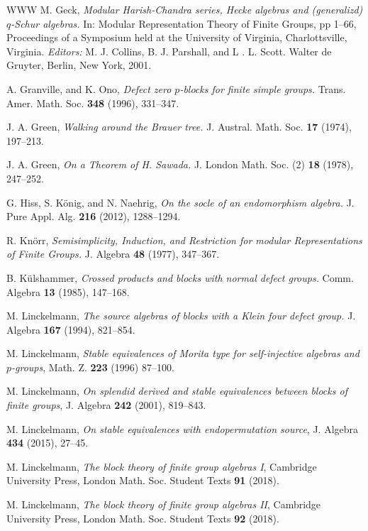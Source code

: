 \documentclass{amsart}
\theoremstyle{plain}\newtheorem{Theorem}{Theorem}[section]
\theoremstyle{plain}\newtheorem{Conjecture}[Theorem]{Conjecture}
\theoremstyle{plain}\newtheorem{Corollary}[Theorem]{Corollary}
\theoremstyle{plain}\newtheorem{Lemma}[Theorem]{Lemma}
\theoremstyle{plain}\newtheorem{Proposition}[Theorem]{Proposition}
\theoremstyle{definition}\newtheorem{Definition}[Theorem]{Definition}
\theoremstyle{definition}\newtheorem{Example}[Theorem]{Example}
\theoremstyle{definition}\newtheorem{Examples}[Theorem]{Examples}
\theoremstyle{definition}\newtheorem{Exercise}[Theorem]{Exercise}
\theoremstyle{definition}\newtheorem{Notation}[Theorem]{Notation}
\theoremstyle{definition}\newtheorem{Remark}[Theorem]{Remark}
\theoremstyle{definition}\newtheorem{Remarks}[Theorem]{Remarks}
\theoremstyle{plain}\newtheorem{Statement}[Theorem]{}
\begin{document}
\begin{thebibliography}{WWW}
 M. Geck, {\em Modular Harish-Chandra series, Hecke algebras
and (generalizd) $q$-Schur algebras.} In: Modular Representation Theory of 
Finite Groups, pp 1--66, Proceedings of a Symposium held at the University
of Virginia, Charlottsville, Virginia.  {\it Editors:} M. J. Collins, B. J. Parshall, 
and L . L. Scott. Walter de Gruyter, Berlin, New York, 2001.

 A. Granville,  and K. Ono, {\em Defect zero $p$-blocks for finite 
simple groups.}   Trans. Amer. Math. Soc. {\bf 348} (1996), 331--347.

 J. A. Green, {\em Walking around the Brauer tree.}
J. Austral. Math. Soc. {\bf 17} (1974), 197--213.

 J. A. Green, {\em On a Theorem of H. Sawada.}
J. London Math. Soc. (2) {\bf 18} (1978), 247--252.

 G. Hiss, S. K\"onig, and N. Naehrig, {\em On the socle of an
endomorphism algebra.} J. Pure Appl. Alg. {\bf 216} (2012), 1288--1294.

 R. Kn\"orr, {\em Semisimplicity, Induction, and Restriction for
modular Representations of Finite Groups.} J. Algebra {\bf 48} (1977), 347--367.

 B. K\"ulshammer, {\em Crossed products and blocks with 
normal defect groups.} Comm. Algebra {\bf 13} (1985), 147--168.

 M. Linckelmann, {\em The source algebras of blocks with
a Klein four defect group.} J. Algebra {\bf 167} (1994), 821--854. 

 M. Linckelmann, {\em Stable equivalences of Morita
type for self-injective algebras and $p$-groups}, Math. Z. {\bf 223}
(1996) 87--100.

 M. Linckelmann, {\em On splendid derived and stable
equivalences between blocks of finite groups}, J. Algebra {\bf 242} 
(2001), 819--843.

 M. Linckelmann, {\em On stable equivalences
with endopermutation source}, J. Algebra {\bf 434} (2015), 27--45.

 M. Linckelmann, {\em The block theory of finite group
algebras I}, Cambridge University Press, London Math. Soc. Student
Texts {\bf 91} (2018). 

 M. Linckelmann, {\em The block theory of finite group
algebras II}, Cambridge University Press, London Math. Soc. Student
Texts {\bf 92} (2018). 


\end{thebibliography}
\end{document}
